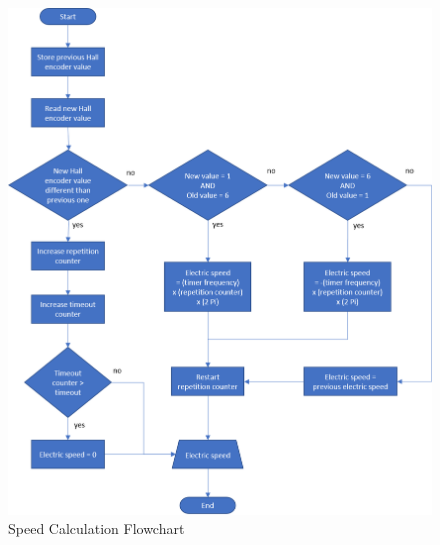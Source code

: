 \vfill
\begin{figure}[htbp]
\centering
\includegraphics[width=\textwidth]{Images/flowcharts/speed_calculation.png} 
\caption[Speed Calculation Flowchart]{Speed Calculation Flowchart}
\label{fig:speed_flow}
\end{figure}
\vfill

